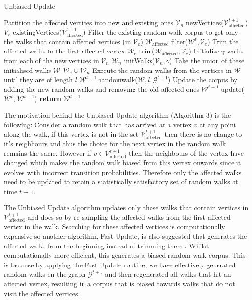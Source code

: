 \documentclass[a4paper]{article}
\renewcommand{\G}{\mathcal G}
\renewcommand{\V}{\mathcal V}
\newcommand{\W}{\mathcal W}
\begin{document}
\begin{algorithm}[!ht]
  \caption{Unbiased Update}
  \begin{algorithmic}[1]

    \Procedure{UnbiasedUpdate}{$\G^{t+1}, \W^t, \V^{t+1}_{\text{affected}}, \gamma, l$}
    \LineComment Partition the affected vertices into new and existing ones
    \State $\V_n$ \leftarrow newVertices($\V^{t+1}_{\text{affected}}$)
    \State $V_e$ \leftarrow existingVertices($\V^{t+1}_{\text{affected}}$)
    \LineComment Filter the existing random walk corpus to get only the walks
    that contain affected vertices (in $\V_e$)
    \State $\W_{\text{affected}}$ \leftarrow filter($\W^t, \V_e$)
    \LineComment Trim the affected walks to the first affected vertex
    \State $\W_e$ \leftarrow trim($\W_{\text{affected}}, \V_e$)
    \LineComment Initialise $\gamma$ walks from each of the new vertices in $\V_n$
    \State $\W_n$ \leftarrow initWalks($\V_n, \gamma$)
    \LineComment Take the union of these initialised walks
    \State $\W$ \leftarrow $\W_e \cup \W_n$
    \LineComment Execute the random walks from the vertices in $\W$ until they are of length $l$
    \State $\W^{t+1}$ \leftarrow randomwalk($\W, l, \G^{t+1}$)
    \LineComment Update the corpus by adding the new random walks and removing the old affected ones
    \State $\W^{t+1}$ \leftarrow update($\W^t$, $\W^{t+1}$)
    \State \textbf{return} $\W^{t+1}$
    \EndProcedure
  \end{algorithmic}
\end{algorithm}
The motivation behind the Unbiased Update algorithm (Algorithm 3) is the following: Consider a
random walk that has arrived at a vertex $v$ at any point along the walk, if
this vertex is not in the set $\V^{t+1}_{\text{affected}}$ then there is no
change to it's neighbours and thus the choice for the next vertex in the random
walk remains the same. However if $v \in \V^{t+1}_{\text{affected}}$ then the
neighbours of the vertex have changed which makes the random walk biased from
this vertex onwards since it evolves with incorrect transition probabilities. Therefore only the affected walks need to be updated to retain a statistically
satisfactory set of random walks at time $t+1$.

The Unbiased Update algorithm updates only those walks that contain vertices in
$\V^{t+1}_{\text{affected}}$ and does so by re-sampling the affected walks from
the first affected vertex in the walk. Searching for these affected vertices is computationally expensive so another algorithm,
Fast Update, is also suggested that generates the affected walks from the
beginning instead of trimming them \cite{sajjad2019}. Whilst computationally more efficient, this
generates a biased random walk corpus. This is because by applying the Fast Update routine, we have
effectively generated random walks on the graph $\G^{t+1}$ and then regenerated
all walks that hit an affected vertex, resulting in a corpus that is biased towards walks
that do not visit the affected vertices.
\end{document}
